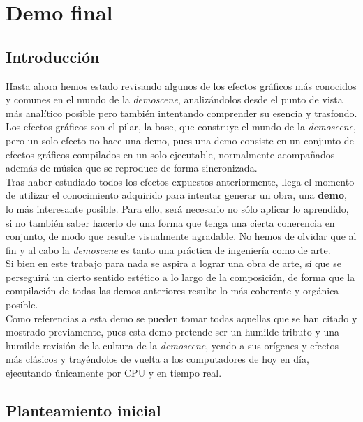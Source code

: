 \chapter{Demo final}

\section{Introducción}

Hasta ahora hemos estado revisando algunos de los efectos gráficos más conocidos y comunes en el mundo de la \emph{demoscene}, analizándolos desde el punto de vista más analítico posible pero también intentando comprender su esencia y trasfondo.\\

Los efectos gráficos son el pilar, la base, que construye el mundo de la \emph{demoscene}, pero un solo efecto no hace una demo, pues una demo consiste en un conjunto de efectos gráficos compilados en un solo ejecutable, normalmente acompañados además de música que se reproduce de forma sincronizada.\\

Tras haber estudiado todos los efectos expuestos anteriormente, llega el momento de utilizar el conocimiento adquirido para intentar generar un obra, una \textbf{demo}, lo más interesante posible. Para ello, será necesario no sólo aplicar lo aprendido, si no también saber hacerlo de una forma que tenga una cierta coherencia en conjunto, de modo que resulte visualmente agradable. No hemos de olvidar que al fin y al cabo la \emph{demoscene} es tanto una práctica de ingeniería como de arte.\\

Si bien en este trabajo para nada se aspira a lograr una obra de arte, sí que se perseguirá un cierto sentido estético a lo largo de la composición, de forma que la compilación de todas las demos anteriores resulte lo más coherente y orgánica posible.\\

Como referencias a esta demo se pueden tomar todas aquellas que se han citado y mostrado previamente, pues esta demo pretende ser un humilde tributo y una humilde revisión de la cultura de la \emph{demoscene}, yendo a sus orígenes y efectos más clásicos y trayéndolos de vuelta a los computadores de hoy en día, ejecutando únicamente por CPU y en tiempo real.\\

\section{Planteamiento inicial}

